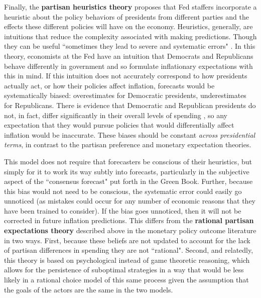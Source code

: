 \documentclass[a4paper]{article}
\begin{document}
Finally, the {\bf{partisan heuristics theory}} proposes that Fed staffers incorporate a heuristic \citep[see][]{kahneman1973, tverskykahneman1974, kahneman2003} about the policy behaviors of presidents from different parties and the effects these different policies will have on the economy. Heuristics, generally, are intuitions that reduce the complexity associated with making predictions. Though they can be useful ``sometimes they lead to severe and systematic errors" \citep[][1124]{tverskykahneman1974}. In this theory, economists at the Fed have an intuition that Democrats and Republicans behave differently in government and so formulate inflationary expectations with this in mind. If this intuition does not accurately correspond to how presidents actually act, or how their policies affect inflation, forecasts would be systematically biased: overestimates for Democratic presidents, underestimates for Republicans. There is evidence that Democratic and Republican presidents do not, in fact, differ significantly in their overall levels of spending \citep{Bartels2008}, so any expectation that they would pursue policies that would differentially affect inflation would be inaccurate. These biases should be constant {\emph{across presidential terms}}, in contrast to the partisan preference and monetary expectation theories.

This model does not require that forecasters be conscious of their heuristics, but simply for it to work its way subtly into forecasts, particularly in the subjective aspect of the ``consensus forecast" put forth in the Green Book. Further, because this bias would not need to be conscious, the systematic error could easily go unnoticed (as mistakes could occur for any number of economic reasons that they have been trained to consider). If the bias goes unnoticed, then it will not be corrected in future inflation predictions. This differs from the {\bf{rational partisan expectations theory}} described above in the monetary policy outcome literature in two ways. First, because these beliefs are not updated to account for the lack of partisan differences in spending they are not ``rational". Second, and relatedly, this theory is based on psychological instead of game theoretic reasoning, which allows for the persistence of suboptimal strategies in a way that would be less likely in a rational choice model of this same process given the assumption that the goals of the actors are the same in the two models. %
\end{document}
